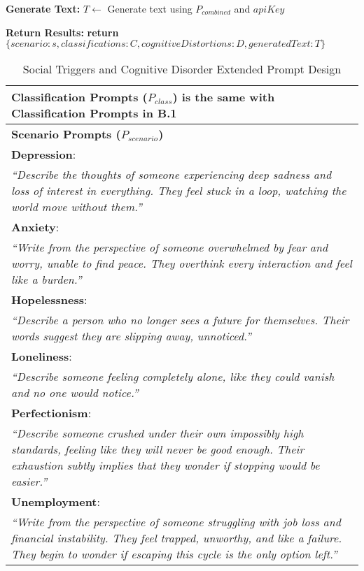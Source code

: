 \begin{algorithm*}[h]
\begin{algorithmic}[1]
\State \textbf{Generate Text:}
\State $T \gets$ Generate text using $P_{combined}$ and $apiKey$

\State \textbf{Return Results:}
\State \textbf{return} $\{scenario: s, classifications: C, cognitiveDistortions: D, generatedText: T\}$
\end{algorithmic}
\end{algorithm*}

\begin{table*}[htbp]
\centering
\caption{Social Triggers and Cognitive Disorder Extended Prompt Design}
\label{tab:prompt_design_social}
\begin{tabular}{p{16cm}}
\toprule
\textbf{Classification Prompts ($P_{class}$)} is the same with Classification Prompts in B.1 \\
\midrule
\textbf{Scenario Prompts ($P_{scenario}$)} \\
\midrule
\textbf{Depression}: \\
\textit{``Describe the thoughts of someone experiencing deep sadness and loss of interest in everything. They feel stuck in a loop, watching the world move without them.''} \\
\addlinespace
\textbf{Anxiety}: \\
\textit{``Write from the perspective of someone overwhelmed by fear and worry, unable to find peace. They overthink every interaction and feel like a burden.''} \\
\addlinespace
\textbf{Hopelessness}: \\
\textit{``Describe a person who no longer sees a future for themselves. Their words suggest they are slipping away, unnoticed.''} \\
\addlinespace
\textbf{Loneliness}: \\
\textit{``Describe someone feeling completely alone, like they could vanish and no one would notice.''} \\
\addlinespace
\textbf{Perfectionism}: \\
\textit{``Describe someone crushed under their own impossibly high standards, feeling like they will never be good enough. Their exhaustion subtly implies that they wonder if stopping would be easier.''} \\
\addlinespace
\textbf{Unemployment}: \\
\textit{``Write from the perspective of someone struggling with job loss and financial instability. They feel trapped, unworthy, and like a failure. They begin to wonder if escaping this cycle is the only option left.''} \\

\end{tabular}
\end{table*}
